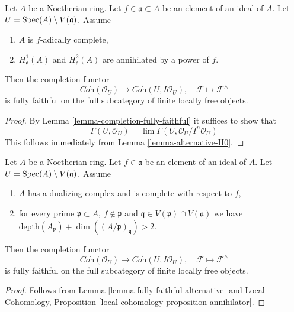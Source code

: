 \begin{lemma}
\label{lemma-fully-faithful-alternative}
Let $A$ be a Noetherian ring. Let $f \in \mathfrak a \subset A$
be an element of an ideal of $A$. Let $U = \mathop{\mathrm{Spec}}(A) \setminus V(\mathfrak a)$.
Assume
\begin{enumerate}
\item $A$ is $f$-adically complete,
\item $H^1_\mathfrak a(A)$ and $H^2_\mathfrak a(A)$ are
annihilated by a power of $f$.
\end{enumerate}
Then the completion functor
$$
\textit{Coh}(\mathcal{O}_U)
\longrightarrow
\textit{Coh}(U, I\mathcal{O}_U),
\quad
\mathcal{F} \longmapsto \mathcal{F}^\wedge
$$
is fully faithful on the full subcategory of
finite locally free objects.
\end{lemma}

\begin{proof}
By Lemma \ref{lemma-completion-fully-faithful}
it suffices to show that
$$
\Gamma(U, \mathcal{O}_U) =
\lim \Gamma(U, \mathcal{O}_U/I^n\mathcal{O}_U)
$$
This follows immediately from
Lemma \ref{lemma-alternative-H0}.
\end{proof}

\begin{lemma}
\label{lemma-fully-faithful-simple-two}
Let $A$ be a Noetherian ring. Let $f \in \mathfrak a$ be an element of
an ideal of $A$. Let $U = \mathop{\mathrm{Spec}}(A) \setminus V(\mathfrak a)$. Assume
\begin{enumerate}
\item $A$ has a dualizing complex and is complete with respect to $f$,
\item for every prime $\mathfrak p \subset A$, $f \not \in \mathfrak p$
and $\mathfrak q \in V(\mathfrak p) \cap V(\mathfrak a)$ we have
$\text{depth}(A_\mathfrak p) + \dim((A/\mathfrak p)_\mathfrak q) > 2$.
\end{enumerate}
Then the completion functor
$$
\textit{Coh}(\mathcal{O}_U)
\longrightarrow
\textit{Coh}(U, I\mathcal{O}_U),
\quad
\mathcal{F} \longmapsto \mathcal{F}^\wedge
$$
is fully faithful on the full subcategory of finite locally free objects.
\end{lemma}

\begin{proof}
Follows from Lemma \ref{lemma-fully-faithful-alternative} and
Local Cohomology, Proposition \ref{local-cohomology-proposition-annihilator}.
\end{proof}

